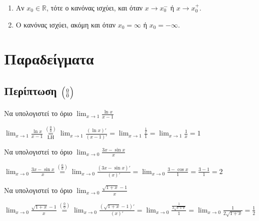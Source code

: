 \begin{rem}
\item {}
  \begin{enumerate}
    \item Αν $ x_{0} \in \mathbb{R} $, τότε ο κανόνας ισχύει, και όταν 
      $ x \to x_{0}^{-} $ ή $ x \to x_{0}^{+} $.
    \item Ο κανόνας ισχύει, ακόμη και όταν $ x_{0} = \infty $ ή $ x_{0} = - \infty $.
  \end{enumerate}
\end{rem}


\section*{Παραδείγματα}

\subsection*{Περίπτωση $ \Bigl(\frac{0}{0}\Bigr) $}

\begin{example}
  Να υπολογιστεί το όριο $ \lim_{x \to 1} \frac{\ln{x}}{x-1} $
\end{example}
\begin{solution}
  $ \lim_{x \to 1} \frac{\ln{x}}{x-1}
  \overset{\left(\frac{0}{0}\right)}{\underset{\mathrm{LH}}{=}}  \lim_{x \to 1} 
  \frac{(\ln{x} )'}{(x-1)'} = \lim_{x \to 1} \frac{\frac{1}{x}}{1} = 
  \lim_{x \to 1} \frac{1}{x} = 1 $
\end{solution}

\begin{example}
  Να υπολογιστεί το όριο $ \lim_{x \to 0} \frac{3x- \sin{x}}{x} $
\end{example}
\begin{solution}
  $ \lim_{x \to 0} \frac{3x- \sin{x}}{x} \overset{(\frac{0}{0})}{=} \lim_{x \to 0}
  \frac{(3x- \sin{x} )'}{(x)'} = \lim_{x \to 0} \frac{3- \cos{x}}{1} = \frac{3- 1}{1}
  = 2 $
\end{solution}

\begin{example}
  Να υπολογιστεί το όριο $ \lim_{x \to 0} \frac{\sqrt{1+x} -1}{x} $
\end{example}
\begin{solution}
  $ \lim_{x \to 0} \frac{\sqrt{1+x} -1}{x} \overset{(\frac{0}{0})}{=} \lim_{x \to 0}
  \frac{(\sqrt{1+x} -1)'}{(x)'} = \lim_{x \to 0} \frac{\frac{1}{2 \sqrt{1+x}}}{1} = 
  \lim_{x \to 0} \frac{1}{2 \sqrt{1+x}} = \frac{1}{2} $
\end{solution}

